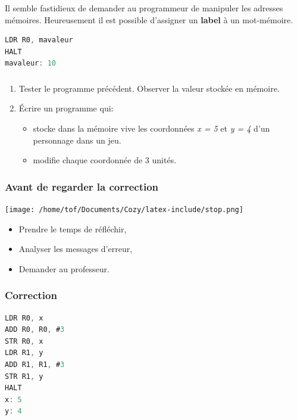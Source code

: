 \documentclass[svgnames,11pt]{beamer}
\begin{document}
\begin{frame}[fragile]
    \frametitle{}
Il semble fastidieux de demander au programmeur de manipuler les adresses mémoires. Heureusement il est possible d'assigner un \textbf{label} à un mot-mémoire.
    \begin{center}
        \begin{lstlisting}[language=C , basicstyle=\small, xleftmargin=2em, xrightmargin=2em]
LDR R0, mavaleur
HALT
mavaleur: 10
\end{lstlisting}
        \label{CODE}
        \end{center}

\end{frame}
\begin{frame}
    \frametitle{}

    \begin{activite}
    \begin{enumerate}
        \item Tester le programme précédent. Observer la valeur stockée en mémoire.
        \item Écrire un programme qui:
        \begin{itemize}
            \item stocke dans la mémoire vive les coordonnées \emph{x = 5} et \emph{y = 4} d'un personnage dans un jeu.
            \item modifie chaque coordonnée de 3 unités.
        \end{itemize}
    \end{enumerate}
    \end{activite}

\end{frame}
\begin{frame}
    \frametitle{Avant de regarder la correction}
\begin{center}
    \centering
    \texttt{[image: /home/tof/Documents/Cozy/latex-include/stop.png]}
    \end{center}
{\Large
    \begin{itemize}
        \item Prendre le temps de réfléchir,
        \item Analyser les messages d'erreur,
        \item Demander au professeur.
    \end{itemize}
}
\end{frame}
\begin{frame}[fragile]
    \frametitle{Correction}

    \begin{center}
        \begin{lstlisting}[language=C , basicstyle=\small, xleftmargin=2em, xrightmargin=2em]
LDR R0, x
ADD R0, R0, #3
STR R0, x
LDR R1, y
ADD R1, R1, #3
STR R1, y
HALT
x: 5
y: 4
\end{lstlisting}
        \end{center}   

\end{frame}
\end{document}
